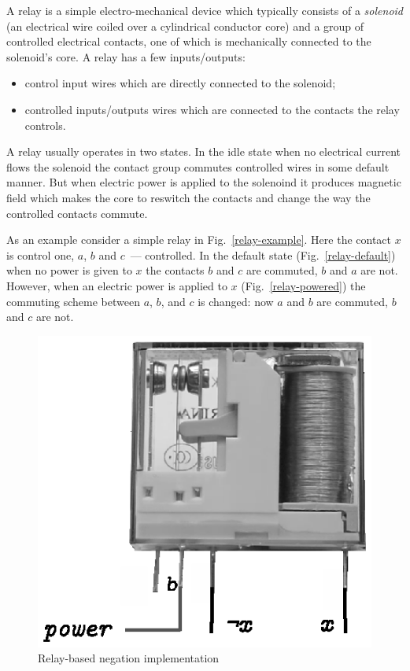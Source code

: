 A relay is a simple electro-mechanical device which typically consists of a \emph{solenoid} (an electrical wire coiled over
a cylindrical conductor core) and a group of controlled electrical contacts, one of which is mechanically connected to the solenoid's core.
A relay has a few inputs/outputs:

\begin{itemize}
\item control input wires which are directly connected to the solenoid;
\item controlled inputs/outputs wires which are connected to the contacts the relay controls.
\end{itemize}

A relay usually operates in two states. In the idle state when no electrical current flows the solenoid the contact group commutes
controlled wires in some default manner. But when electric power is applied to the solenoind it produces magnetic field which
makes the core to reswitch the contacts and change the way the controlled contacts commute.

As an example consider a simple relay in Fig.~\ref{relay-example}. Here the contact $x$ is control one, $a$, $b$ and $c$~--- controlled.
In the default state (Fig.~\ref{relay-default}) when no power is given to $x$ the contacts $b$ and $c$ are commuted, $b$ and $a$ are not.
However, when an electric power is applied to $x$ (Fig.~\ref{relay-powered}) the commuting scheme between $a$, $b$, and $c$ is
changed: now $a$ and $b$ are commuted, $b$ and $c$ are not.

\begin{figure}[t]
  \centering
  \includegraphics{images/06-08.eps}
  \caption{Relay-based negation implementation}
  \label{relay-negation}
\end{figure}


